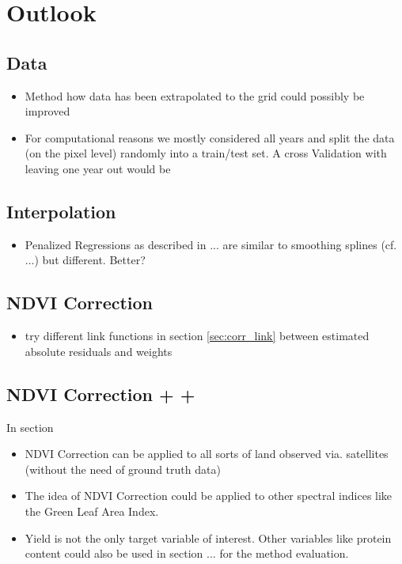 \chapter{Outlook}
\section{Data}
\begin{itemize}
    \item Method how data has been extrapolated to the grid could possibly be improved
    \item For computational reasons we mostly considered all years and split the data (on the pixel level) randomly into a train/test set. A cross Validation with leaving one year out would be 
\end{itemize}    

\section{Interpolation}
\begin{itemize}
    \item Penalized Regressions as described in ... are similar to smoothing splines (cf. ...) but different. Better?
\end{itemize}    

\section{NDVI Correction}
\begin{itemize}
    \item try different link functions in section \ref{sec:corr_link} between estimated absolute residuals and weights
\end{itemize}    


\section{NDVI Correction + +}
In section
\begin{itemize}
    \item NDVI Correction can be applied to all sorts of land observed via. satellites (without the need of ground truth data)
    \item The idea of NDVI Correction could be applied to other spectral indices like the Green Leaf Area Index.
    \item Yield is not the only target variable of interest. Other variables like protein content could also be used in section ... for the method evaluation. 
\end{itemize}    
